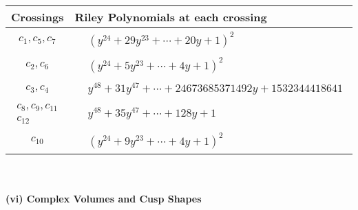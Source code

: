 \documentclass[1p]{elsarticle_modified}
\theoremstyle{definition}
\begin{document}
\begin{tabular}{m{50pt}|m{274pt}}
Crossings & \hspace{64pt}Riley Polynomials at each crossing \\
\hline $$\begin{aligned}c_{1},c_{5},c_{7}\end{aligned}$$&$\begin{aligned}
&(y^{24}+29 y^{23}+\cdots+20 y+1)^{2}
\end{aligned}$\\
\hline $$\begin{aligned}c_{2},c_{6}\end{aligned}$$&$\begin{aligned}
&(y^{24}+5 y^{23}+\cdots+4 y+1)^{2}
\end{aligned}$\\
\hline $$\begin{aligned}c_{3},c_{4}\end{aligned}$$&$\begin{aligned}
&y^{48}+31 y^{47}+\cdots+24673685371492 y+1532344418641
\end{aligned}$\\
\hline $$\begin{aligned}c_{8},c_{9},c_{11}\\c_{12}\end{aligned}$$&$\begin{aligned}
&y^{48}+35 y^{47}+\cdots+128 y+1
\end{aligned}$\\
\hline $$\begin{aligned}c_{10}\end{aligned}$$&$\begin{aligned}
&(y^{24}+9 y^{23}+\cdots+4 y+1)^{2}
\end{aligned}$\\
\hline
\end{tabular}\\~\\
\newpage\flushleft \textbf{(vi) Complex Volumes and Cusp Shapes}
\end{document}
